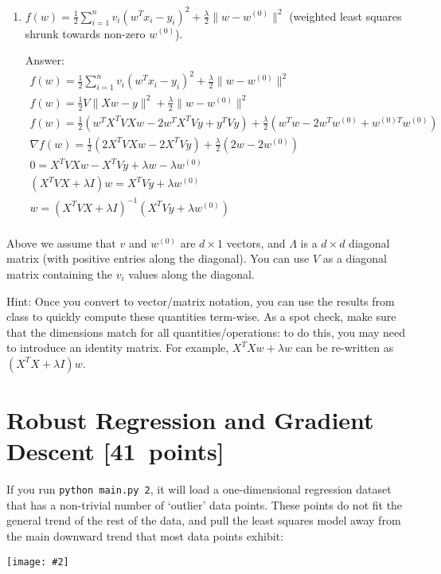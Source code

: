 \documentclass{article}
\newenvironment{answer}{\par\begingroup\color{gre}Answer: }{\endgroup}
\newcommand\pts[1]{\textcolor{pointscolour}{[#1~points]}}
\newcommand{\norm}[1]{\lVert #1 \rVert}
\newcommand{\centerfig}[2]{\begin{center}\texttt{[image: \#2]}\end{center}}
\begin{document}
\begin{enumerate}
\item $f(w) = \frac{1}{2} \sum_{i=1}^n v_i (w^Tx_i - y_i)^2 + \frac{\lambda}{2}\norm{w-w^{(0)}}^2$ (weighted least squares shrunk towards non-zero $w^{(0)}$). \label{item:weighted-shrunk-ls}
    \begin{answer}
    \begin{gather*}
    f(w) = \frac{1}{2} \sum_{i=1}^n v_i (w^Tx_i - y_i)^2 + \frac{\lambda}{2}\norm{w-w^{(0)}}^2 \\
    f(w) = \frac{1}{2} V\norm{Xw - y}^2 + \frac{\lambda}{2}\norm{w-w^{(0)}}^2 \\
    f(w) = \frac{1}{2} (w^TX^TVXw - 2w^TX^TVy + y^TVy) + \frac{\lambda}{2}(w^Tw-2w^Tw^{(0)}+w^{(0)T}w^{(0)})\\
    \nabla f(w) = \frac{1}{2} (2X^TVXw - 2X^TVy) + \frac{\lambda}{2}(2w-2w^{(0)})\\
    0 = X^TVXw - X^TVy + \lambda w-\lambda w^{(0)}\\
    (X^TVX + \lambda I) w = X^TVy + \lambda w^{(0)}\\
    w = (X^TVX + \lambda I)^{-1}(X^TVy + \lambda w^{(0)})\\
    \end{gather*}
    \end{answer}
\end{enumerate}
Above we assume that $v$ and $w^{(0)}$ are $d \times 1$ vectors, and $\Lambda$ is a $d \times d$ diagonal matrix (with positive entries along the diagonal). You can use $V$ as a diagonal matrix containing the $v_i$ values along the diagonal.

Hint: Once you convert to vector/matrix notation, you can use the results from class to quickly compute these quantities term-wise.
As a spot check, make sure that the dimensions match for all quantities/operations: to do this, you may need to introduce an identity matrix. For example, $X^T X w + \lambda w$ can be re-written as $(X^T X + \lambda I)w$.


\clearpage
\section{Robust Regression and Gradient Descent \pts{41}}

If you run \verb|python main.py 2|, it will load a one-dimensional regression
dataset that has a non-trivial number of `outlier' data points.
These points do not fit the general trend of the rest of the data,
and pull the least squares model away from the main downward trend that most data points exhibit:
\centerfig{.7}{./figs/least_squares_outliers.pdf}
\end{document}
